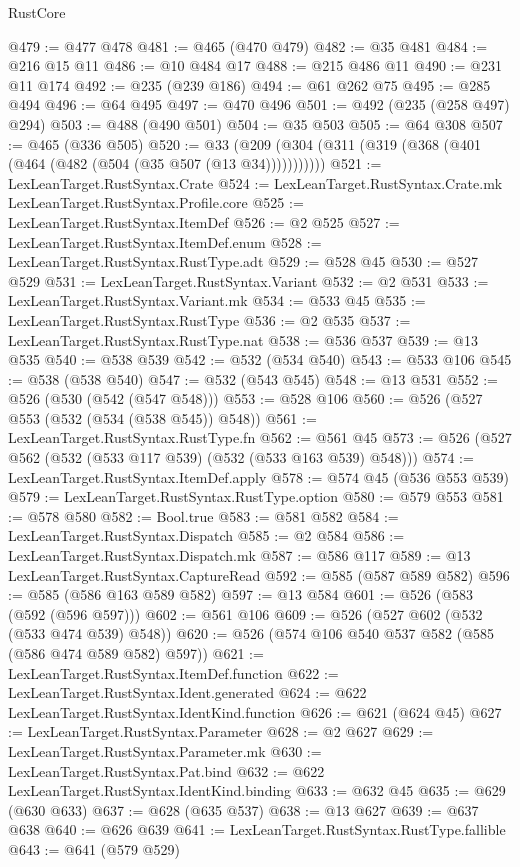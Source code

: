 \begin{lexlean}{RustCore}
\begin{coremodule}
@479 := @477 @478
@481 := @465 (@470 @479)
@482 := @35 @481
@484 := @216 @15 @11
@486 := @10 @484 @17
@488 := @215 @486 @11
@490 := @231 @11 @174
@492 := @235 (@239 @186)
@494 := @61 @262 @75
@495 := @285 @494
@496 := @64 @495
@497 := @470 @496
@501 := @492 (@235 (@258 @497) @294)
@503 := @488 (@490 @501)
@504 := @35 @503
@505 := @64 @308
@507 := @465 (@336 @505)
@520 := @33 (@209 (@304 (@311 (@319 (@368 (@401 (@464 (@482 (@504 (@35 @507 (@13 @34)))))))))))
@521 := LexLeanTarget.RustSyntax.Crate
@524 := LexLeanTarget.RustSyntax.Crate.mk LexLeanTarget.RustSyntax.Profile.core
@525 := LexLeanTarget.RustSyntax.ItemDef
@526 := @2 @525
@527 := LexLeanTarget.RustSyntax.ItemDef.enum
@528 := LexLeanTarget.RustSyntax.RustType.adt
@529 := @528 @45
@530 := @527 @529
@531 := LexLeanTarget.RustSyntax.Variant
@532 := @2 @531
@533 := LexLeanTarget.RustSyntax.Variant.mk
@534 := @533 @45
@535 := LexLeanTarget.RustSyntax.RustType
@536 := @2 @535
@537 := LexLeanTarget.RustSyntax.RustType.nat
@538 := @536 @537
@539 := @13 @535
@540 := @538 @539
@542 := @532 (@534 @540)
@543 := @533 @106
@545 := @538 (@538 @540)
@547 := @532 (@543 @545)
@548 := @13 @531
@552 := @526 (@530 (@542 (@547 @548)))
@553 := @528 @106
@560 := @526 (@527 @553 (@532 (@534 (@538 @545)) @548))
@561 := LexLeanTarget.RustSyntax.RustType.fn
@562 := @561 @45
@573 := @526 (@527 @562 (@532 (@533 @117 @539) (@532 (@533 @163 @539) @548)))
@574 := LexLeanTarget.RustSyntax.ItemDef.apply
@578 := @574 @45 (@536 @553 @539)
@579 := LexLeanTarget.RustSyntax.RustType.option
@580 := @579 @553
@581 := @578 @580
@582 := Bool.true
@583 := @581 @582
@584 := LexLeanTarget.RustSyntax.Dispatch
@585 := @2 @584
@586 := LexLeanTarget.RustSyntax.Dispatch.mk
@587 := @586 @117
@589 := @13 LexLeanTarget.RustSyntax.CaptureRead
@592 := @585 (@587 @589 @582)
@596 := @585 (@586 @163 @589 @582)
@597 := @13 @584
@601 := @526 (@583 (@592 (@596 @597)))
@602 := @561 @106
@609 := @526 (@527 @602 (@532 (@533 @474 @539) @548))
@620 := @526 (@574 @106 @540 @537 @582 (@585 (@586 @474 @589 @582) @597))
@621 := LexLeanTarget.RustSyntax.ItemDef.function
@622 := LexLeanTarget.RustSyntax.Ident.generated
@624 := @622 LexLeanTarget.RustSyntax.IdentKind.function
@626 := @621 (@624 @45)
@627 := LexLeanTarget.RustSyntax.Parameter
@628 := @2 @627
@629 := LexLeanTarget.RustSyntax.Parameter.mk
@630 := LexLeanTarget.RustSyntax.Pat.bind
@632 := @622 LexLeanTarget.RustSyntax.IdentKind.binding
@633 := @632 @45
@635 := @629 (@630 @633)
@637 := @628 (@635 @537)
@638 := @13 @627
@639 := @637 @638
@640 := @626 @639
@641 := LexLeanTarget.RustSyntax.RustType.fallible
@643 := @641 (@579 @529)

\end{coremodule}
\end{lexlean}

